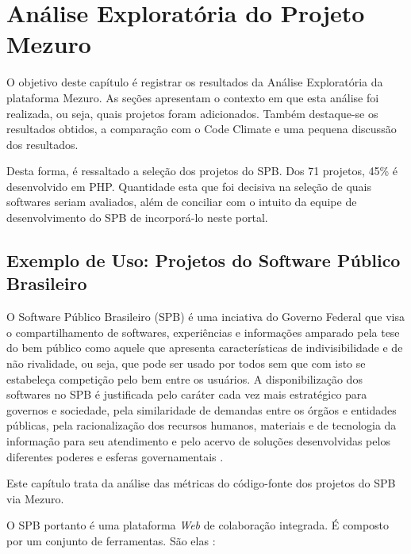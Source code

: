 \chapter{Análise Exploratória do Projeto Mezuro}

O objetivo deste capítulo é registrar os resultados da Análise Exploratória da
plataforma Mezuro. As seções apresentam o contexto em que esta análise foi
realizada, ou seja, quais projetos foram adicionados. Também destaque-se os
resultados obtidos, a comparação com o Code Climate e uma pequena discussão dos
resultados.

Desta forma, é ressaltado a seleção dos projetos do SPB. Dos 71 projetos, 45\% é
desenvolvido em PHP. Quantidade esta que foi decisiva na seleção de quais
softwares seriam avaliados, além de conciliar com o intuito da equipe de
desenvolvimento do SPB de incorporá-lo neste portal.

\section{Exemplo de Uso: Projetos do Software Público Brasileiro}

O Software Público Brasileiro (SPB) é uma inciativa do Governo Federal que visa
o compartilhamento de softwares, experiências e informações amparado pela tese
do bem público como aquele que apresenta características de indivisibilidade e
de não rivalidade, ou seja, que pode ser usado por todos sem que com isto se
estabeleça competição pelo bem entre os usuários. A disponibilização dos
softwares no SPB é justificada pelo caráter cada vez mais estratégico para
governos e sociedade, pela similaridade de demandas entre os órgãos e entidades
públicas, pela racionalização dos recursos humanos, materiais e de tecnologia
da informação para seu atendimento e pelo acervo de soluções desenvolvidas
pelos diferentes poderes e esferas governamentais \cite{santos2011in01}.

Este capítulo trata da análise das métricas do código-fonte dos projetos do SPB
via Mezuro.

O SPB portanto é uma plataforma \textit{Web} de colaboração integrada. É composto por um
conjunto de ferramentas. São elas \cite{aboutSPB}:

